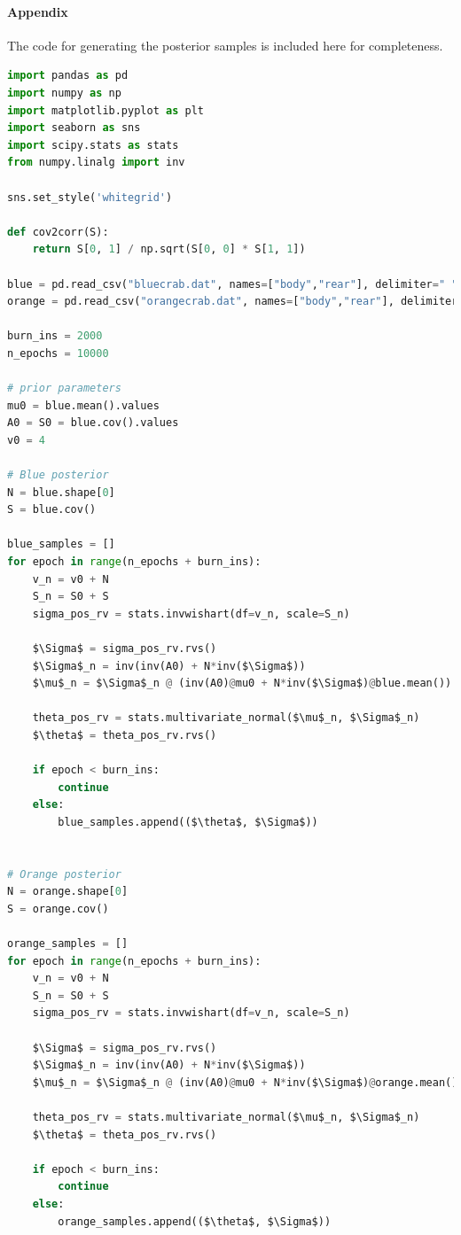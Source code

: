 \documentclass[11pt, letterpaper]{article}
\begin{document}
\paragraph{Appendix}
The code for generating the posterior samples is included here for completeness.
\begin{lstlisting}[language=Python]
import pandas as pd
import numpy as np
import matplotlib.pyplot as plt
import seaborn as sns
import scipy.stats as stats
from numpy.linalg import inv

sns.set_style('whitegrid')

def cov2corr(S):
    return S[0, 1] / np.sqrt(S[0, 0] * S[1, 1])

blue = pd.read_csv("bluecrab.dat", names=["body","rear"], delimiter=" ")
orange = pd.read_csv("orangecrab.dat", names=["body","rear"], delimiter=" ")

burn_ins = 2000
n_epochs = 10000

# prior parameters
mu0 = blue.mean().values
A0 = S0 = blue.cov().values
v0 = 4

# Blue posterior
N = blue.shape[0]
S = blue.cov()

blue_samples = []
for epoch in range(n_epochs + burn_ins):
    v_n = v0 + N
    S_n = S0 + S
    sigma_pos_rv = stats.invwishart(df=v_n, scale=S_n)

    $\Sigma$ = sigma_pos_rv.rvs()
    $\Sigma$_n = inv(inv(A0) + N*inv($\Sigma$))
    $\mu$_n = $\Sigma$_n @ (inv(A0)@mu0 + N*inv($\Sigma$)@blue.mean())

    theta_pos_rv = stats.multivariate_normal($\mu$_n, $\Sigma$_n)
    $\theta$ = theta_pos_rv.rvs()

    if epoch < burn_ins:
        continue 
    else:
        blue_samples.append(($\theta$, $\Sigma$))
    

# Orange posterior
N = orange.shape[0]
S = orange.cov()

orange_samples = []
for epoch in range(n_epochs + burn_ins):
    v_n = v0 + N
    S_n = S0 + S
    sigma_pos_rv = stats.invwishart(df=v_n, scale=S_n)

    $\Sigma$ = sigma_pos_rv.rvs()
    $\Sigma$_n = inv(inv(A0) + N*inv($\Sigma$))
    $\mu$_n = $\Sigma$_n @ (inv(A0)@mu0 + N*inv($\Sigma$)@orange.mean())

    theta_pos_rv = stats.multivariate_normal($\mu$_n, $\Sigma$_n)
    $\theta$ = theta_pos_rv.rvs()

    if epoch < burn_ins:
        continue 
    else:
        orange_samples.append(($\theta$, $\Sigma$))
\end{lstlisting}
\end{document}
